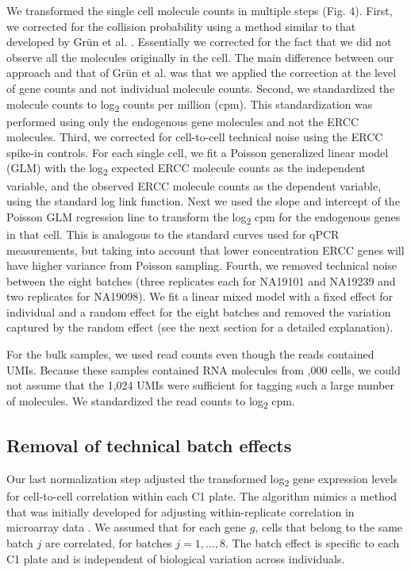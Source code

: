 We transformed the single cell molecule counts in multiple steps (Fig.
4). First, we corrected for the collision probability using a method
similar to that developed by Grün et al. \citep{Grun2014}. Essentially
we corrected for the fact that we did not observe all the molecules
originally in the cell. The main difference between our approach and
that of Grün et al. \citep{Grun2014} was that we applied the
correction at the level of gene counts and not individual molecule
counts. Second, we standardized the molecule counts to
log\textsubscript{2} counts per million (cpm). This standardization
was performed using only the endogenous gene molecules and not the
ERCC molecules. Third, we corrected for cell-to-cell technical noise
using the ERCC spike-in controls. For each single cell, we fit a
Poisson generalized linear model (GLM) with the log\textsubscript{2}
expected ERCC molecule counts as the independent variable, and the
observed ERCC molecule counts as the dependent variable, using the
standard log link function. Next we used the slope and intercept of
the Poisson GLM regression line to transform the log\textsubscript{2}
cpm for the endogenous genes in that cell. This is analogous to the
standard curves used for qPCR measurements, but taking into account
that lower concentration ERCC genes will have higher variance from
Poisson sampling. Fourth, we removed technical noise between the eight
batches (three replicates each for NA19101 and NA19239 and two
replicates for NA19098). We fit a linear mixed model with a fixed
effect for individual and a random effect for the eight batches and
removed the variation captured by the random effect (see the next
section for a detailed explanation).

For the bulk samples, we used read counts even though the reads
contained UMIs. Because these samples contained RNA molecules from
,000 cells, we could not assume that the 1,024 UMIs were
sufficient for tagging such a large number of molecules. We
standardized the read counts to log\textsubscript{2} cpm.

\subsection{Removal of technical batch
effects}\label{removal-of-technical-batch-effects}

Our last normalization step adjusted the transformed
log\textsubscript{2} gene expression levels for cell-to-cell
correlation within each C1 plate. The algorithm mimics a method that
was initially developed for adjusting within-replicate correlation in
microarray data \citep{Smyth2005}. We assumed that for each gene $g$,
cells that belong to the same batch $j$ are correlated, for batches $j
= 1, \dots, 8$. The batch effect is specific to each C1 plate and is
independent of biological variation across individuals.

